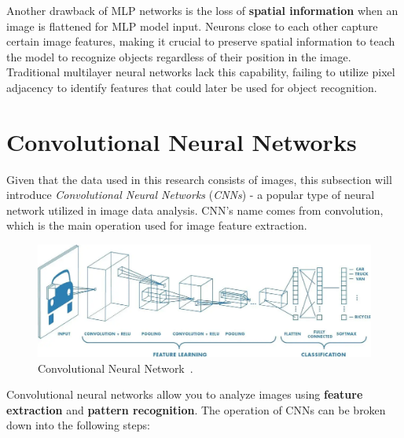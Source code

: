Another drawback of MLP networks is the loss of \textbf{spatial information} when an image is flattened for MLP model input. Neurons close to each other capture certain image features, making it crucial to preserve spatial information to teach the model to recognize objects regardless of their position in the image. Traditional multilayer neural networks lack this capability, failing to utilize pixel adjacency to identify features that could later be used for object recognition.


\section{Convolutional Neural Networks}
\label{sec:CNNs}

Given that the data used in this research consists of images, this subsection will introduce \textit{Convolutional Neural Networks} (\textit{CNNs}) - a popular type of neural network utilized in image data analysis. CNN's name comes from convolution, which is the main operation used for image feature extraction.

\begin{figure}[!htb]
    \centering
    \includegraphics[scale=0.3]{Images/CNN-model.jpg}
    \caption{Convolutional Neural Network~\cite{CNNBlogGuide}.}
    \label{fig:CNNModel}
\end{figure}

Convolutional neural networks allow you to analyze images using \textbf{feature extraction} and \textbf{pattern recognition}. The operation of CNNs can be broken down into the following steps:

